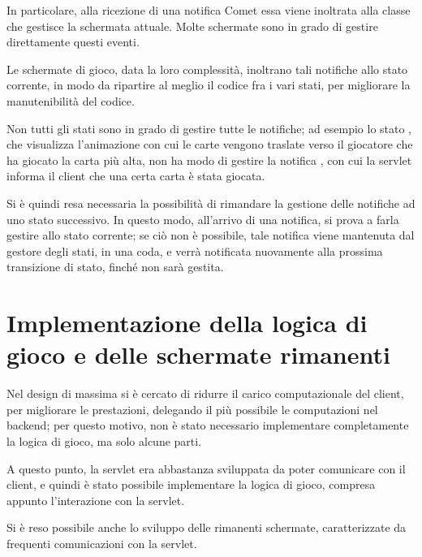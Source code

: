\documentclass[a4paper,12pt,final]{article}
\begin{document}
In particolare, alla ricezione di una notifica Comet essa viene inoltrata
alla classe che gestisce la schermata attuale.
Molte schermate sono in grado di gestire direttamente questi eventi.

Le schermate di gioco, data la loro complessit\`a, inoltrano tali notifiche
allo stato corrente, in modo da ripartire al meglio il codice fra i vari
stati, per migliorare la manutenibilit\`a del codice.

Non tutti gli stati sono in grado di gestire tutte le notifiche; ad esempio
lo stato \verb@EndOfTrickState@, che visualizza l'animazione con cui le carte
vengono traslate verso il giocatore che ha giocato la carta pi\`u alta, non ha
modo di gestire la notifica \verb@CardPlayed@, con cui la servlet informa il
client che una certa carta \`e stata giocata.

Si \`e quindi resa necessaria la possibilit\`a di rimandare la gestione delle
notifiche ad uno stato successivo. In questo modo, all'arrivo di una notifica,
si prova a farla gestire allo stato corrente; se ci\`o non \`e possibile, tale
notifica viene mantenuta dal gestore degli stati, in una coda, e verr\`a
notificata nuovamente alla prossima transizione di stato, finch\'e non sar\`a
gestita.


\section{Implementazione della logica di gioco e delle schermate rimanenti}

Nel design di massima si \`e cercato di ridurre il carico computazionale
del client, per migliorare le prestazioni, delegando il pi\`u possibile
le computazioni nel backend; per questo motivo, non \`e stato necessario
implementare completamente la logica di gioco, ma solo alcune parti.

A questo punto, la servlet era abbastanza sviluppata da poter comunicare con
il client, e quindi \`e stato possibile implementare la logica di gioco,
compresa appunto l'interazione con la servlet.

Si \`e reso possibile anche lo sviluppo delle rimanenti schermate,
caratterizzate da frequenti comunicazioni con la servlet.
\end{document}
